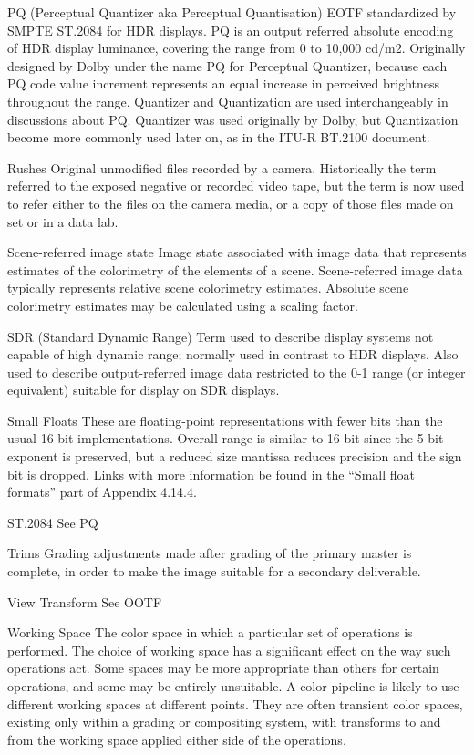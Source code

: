 PQ (Perceptual Quantizer aka Perceptual Quantisation)
EOTF standardized by SMPTE ST.2084 for HDR displays. PQ is an output referred absolute encoding of HDR display luminance, covering the range from 0 to 10,000 cd/m2. Originally designed by Dolby under the name PQ for Perceptual Quantizer, because each PQ code value increment represents an equal increase in perceived brightness throughout the range. Quantizer and Quantization are used interchangeably in discussions about PQ. Quantizer was used originally by Dolby, but Quantization become more commonly used later on, as in the ITU-R BT.2100 document.

Rushes
Original unmodified files recorded by a camera. Historically the term referred to the exposed negative or recorded video tape, but the term is now used to refer either to the files on the camera media, or a copy of those files made on set or in a data lab.

Scene-referred image state
Image state associated with image data that represents estimates of the colorimetry of the elements of a scene. Scene-referred image data typically represents relative scene colorimetry estimates. Absolute scene colorimetry estimates may be calculated using a scaling factor.

SDR (Standard Dynamic Range)
Term used to describe display systems not capable of high dynamic range; normally used in contrast to HDR displays. Also used to describe output-referred image data restricted to the 0-1 range (or integer equivalent) suitable for display on SDR displays.

Small Floats
These are floating-point representations with fewer bits than the usual 16-bit implementations. Overall range is similar to 16-bit since the 5-bit exponent is preserved, but a reduced size mantissa reduces precision and the sign bit is dropped. Links with more information be found in the “Small float formats” part of Appendix 4.14.4.

ST.2084
See PQ

Trims
Grading adjustments made after grading of the primary master is complete, in order to make the image suitable for a secondary deliverable.

View Transform
See OOTF

Working Space
The color space in which a particular set of operations is performed. The choice of working space has a significant effect on the way such operations act. Some spaces may be more appropriate than others for certain operations, and some may be entirely unsuitable. A color pipeline is likely to use different working spaces at different points. They are often transient color spaces, existing only within a grading or compositing system, with transforms to and from the working space applied either side of the operations.
